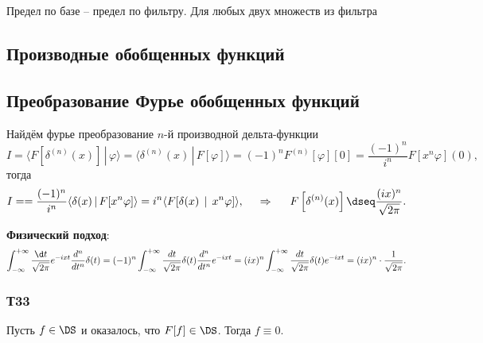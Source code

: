 Предел по базе -- предел по фильтру. Для любых двух множеств из фильтра


\subsection{Производные обобщенных функций}









\subsection{Преобразование Фурье обобщенных функций}




Найдём фурье преобразование $n$-й производной дельта-функции
\begin{equation*}
    I = \langle F[\delta^{(n)} (x)] \,|\, \varphi \rangle = \langle \delta^{(n)} (x) \,|\, F[\varphi] \rangle  = (-1)^n F^{(n)} [\varphi][0] = 
    \frac{(-1)^n}{i^n} F[x^n \varphi](0),
\end{equation*}
тогда
\begin{equation*}
    I = = 
    \frac{(-1)^n}{i^n} \langle \delta(x) \,|\, F[x^n \varphi] \rangle = i^n \langle F[\delta(x) \,\mid\, x^n \varphi]\rangle,
    \hspace{0.5cm} \Rightarrow \hspace{0.5cm}
    F\left[\delta^{(n)} (x)\right] \dseq \frac{(ix)^n}{\sqrt{2\pi}}.
\end{equation*}
 
\textbf{Физический подход}:
\begin{equation*}
    \int_{-\infty}^{+\infty} \frac{\d t}{\sqrt{2\pi}} e^{-ixt} \frac{d^n}{d t^n} \delta(t) = 
    (-1)^n \int_{-\infty}^{+\infty} \frac{d t}{\sqrt{2\pi}} \delta(t) \frac{d^n }{d t^n} e^{- i x t} = 
    (i x)^n \int_{-\infty}^{+\infty} \frac{d t}{\sqrt{2\pi}}  \delta(t) e^{-ixt} = (ix)^n \cdot \frac{1}{\sqrt{2\pi}}.
\end{equation*}




\subsubsection*{Т33}

\begin{to_thr}[]
    Пусть $f \in \DS$ и оказалось, что $F[f] \in \DS$. Тогда $f \equiv 0$.
\end{to_thr}





